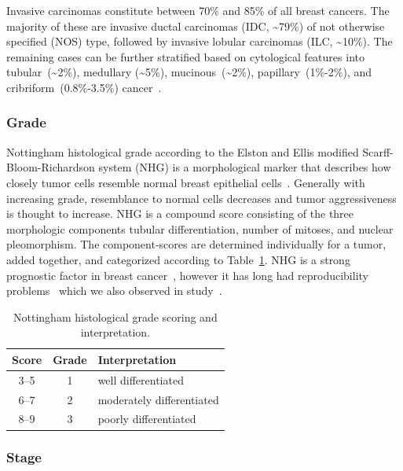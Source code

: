 \documentclass[11pt]{book}
\begin{document}
Invasive carcinomas constitute between 70\% and 85\% of all breast cancers. The majority of these are invasive ductal carcinomas (IDC, \textasciitilde79\%) of not otherwise specified (NOS) type, followed by invasive lobular carcinomas (ILC, \textasciitilde10\%). The remaining cases can be further stratified based on cytological features into tubular~(\textasciitilde2\%), medullary (\textasciitilde5\%), mucinous~(\textasciitilde2\%), papillary~(1\%-2\%), and cribriform~(0.8\%-3.5\%) cancer~\cite{Makki:2015}.


\subsubsection{Grade}

Nottingham histological grade according to the Elston and Ellis modified Scarff-Bloom-Richardson system (NHG) is a morphological marker that describes how closely tumor cells resemble normal breast epithelial cells~\cite{ElstonEllis:1991}. Generally with increasing grade, resemblance to normal cells decreases and tumor aggressiveness is thought to increase. NHG is a compound score consisting of the three morphologic components tubular differentiation, number of mitoses, and nuclear pleomorphism. The component-scores are determined individually for a tumor, added together, and categorized according to Table~\ref{tab:nhg-scoring}. NHG is a strong prognostic factor in breast cancer~\cite{Rakha:2008}, however it has long had reproducibility problems~\cite{Rakha:2010} which we also observed in study~\III.

\begin{table}[t]
\centering
\caption[Nottingham Histological Grade]{Nottingham histological grade scoring and interpretation.}
\label{tab:nhg-scoring}
\begin{tabular}{ ccl }
\toprule
Score & Grade & Interpretation \\
\midrule
3--5 & 1 & well differentiated \\
6--7 & 2 & moderately differentiated \\
8--9 & 3 & poorly differentiated \\
\bottomrule
\end{tabular}
\end{table}


\subsubsection{Stage}
\end{document}
